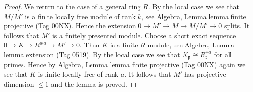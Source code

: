 \documentclass{amsart}
\theoremstyle{plain}
\theoremstyle{definition}
\theoremstyle{remark}
\numberwithin{equation}{subsection}
\begin{document}
\begin{proof}
\medskip\noindent
We return to the case of a general ring $R$. By the local case
we see that $M/M'$ is a finite locally free module of rank $k$, see
Algebra, Lemma \href{https://stacks.math.columbia.edu/tag/00NX}{lemma finite projective (Tag 00NX)}. Hence the extension
$0 \to M' \to M \to M/M' \to 0$ splits. It follows that $M'$
is a finitely presented module. Choose a short exact sequence
$0 \to K \to R^{\oplus a} \to M' \to 0$. Then $K$ is a finite
$R$-module, see Algebra, Lemma \href{https://stacks.math.columbia.edu/tag/0519}{lemma extension (Tag 0519)}.
By the local case we see that $K_\mathfrak p \cong R_\mathfrak p^{\oplus a}$
for all primes. Hence by
Algebra, Lemma \href{https://stacks.math.columbia.edu/tag/00NX}{lemma finite projective (Tag 00NX)}
again we see that $K$ is finite locally free of rank $a$.
It follows that $M'$ has projective dimension $\leq 1$
and the lemma is proved.
\end{proof}
\end{document}
